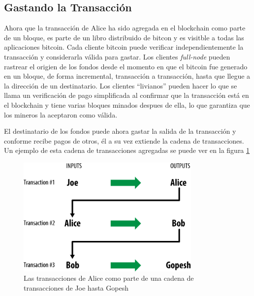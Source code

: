\documentclass[10pt,journal,compsoc]{IEEEtran}
\begin{document}
\subsection{Gastando la Transacción}
Ahora que la transacción de Alice ha sido agregada en el blockchain como parte de un bloque, es parte de un libro distribuido de bitcon y es visitble a todas las aplicaciones bitcoin. Cada cliente bitcoin puede verificar independientemente la transacción y considerarla válida para gastar. Los clientes \emph{full-node} pueden rastrear el origien de los fondos desde el momento en que el bitcoin fue generado en un bloque, de forma incremental, transacción a transacción, hasta que llegue a la dirección de un destinatario. Los clientes ``livianos'' pueden hacer lo que se llama un verificación de pago simplificada al confirmar que la transacción está en el blockchain y tiene varias bloques minados despues de ella, lo que garantiza que los mineros la aceptaron como válida.

El destinatario de los fondos puede ahora gastar la salida de la transacción y conforme recibe pagos de otros, él a su vez extiende la cadena de transacciones. Un ejemplo de esta cadena de transacciones agregadas se puede ver en la figura \ref{fig:transaction-chain}

\begin{figure}[h]
    \center
    \includegraphics[width=9cm]{transaction-chain}
    \caption{Las transacciones de Alice como parte de una cadena de transacciones de Joe hasta Gopesh}
    \label{fig:transaction-chain}
\end{figure}

\end{document}
